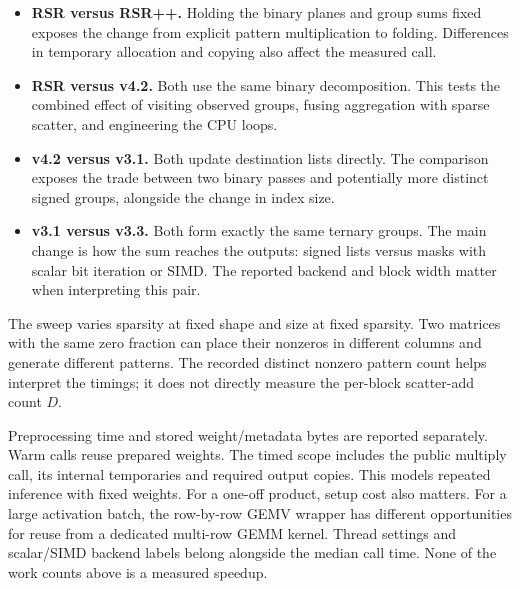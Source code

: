 \documentclass[11pt,a4paper]{article}
\begin{document}
\begin{itemize}
\item \textbf{RSR versus RSR++.} Holding the binary planes and group sums
fixed exposes the change from explicit pattern multiplication to folding.
Differences in temporary allocation and copying also affect the measured call.
\item \textbf{RSR versus v4.2.} Both use the same binary decomposition.
This tests the combined effect of visiting observed groups, fusing aggregation
with sparse scatter, and engineering the CPU loops.
\item \textbf{v4.2 versus v3.1.} Both update destination lists directly.
The comparison exposes the trade between two binary passes and potentially
more distinct signed groups, alongside the change in index size.
\item \textbf{v3.1 versus v3.3.} Both form exactly the same ternary groups.
The main change is how the sum reaches the outputs: signed lists versus
masks with scalar bit iteration or SIMD. The reported backend and block
width matter when interpreting this pair.
\end{itemize}

The sweep varies sparsity at fixed shape and size at fixed sparsity. Two
matrices with the same zero fraction can place their nonzeros in different
columns and generate different patterns. The recorded distinct nonzero
pattern count helps interpret the timings; it does not directly measure
the per-block scatter-add count \(D\).

Preprocessing time and stored weight/metadata bytes are reported separately.
Warm calls reuse prepared weights. The timed scope includes the public
multiply call, its internal temporaries and required output copies. This
models repeated inference with fixed weights. For a one-off product, setup
cost also matters. For a large activation batch, the row-by-row GEMV wrapper
has different opportunities for reuse from a dedicated multi-row GEMM kernel.
Thread settings and scalar/SIMD backend labels belong alongside the median
call time. None of the work counts above is a measured speedup.

\end{document}
